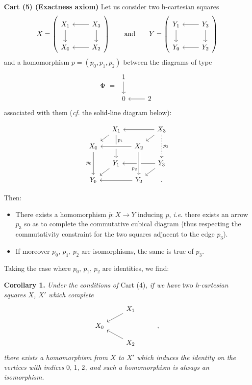 
\textbf{Cart (5) (Exactness axiom)} Let us consider two h-cartesian squares
\[
X = \left(\begin{tikzcd}
X_1 \ar[d] & X_3 \ar[l] \ar[d] \\
X_0 & X_2 \ar[l]
\end{tikzcd}\right)
\qquad \text{and} \qquad
Y = \left(\begin{tikzcd}
Y_1 \ar[d] & Y_3 \ar[l] \ar[d] \\
Y_0 & Y_2 \ar[l]
\end{tikzcd}\right)
\]
and a homomorphism $p = (p_0, p_1, p_2)$ between the diagrams of type
\[
\Phi \ = \
\begin{tikzcd}
1 \ar[d] & \\
0 & 2 \ar[l]
\end{tikzcd}
\]
associated with them (\textit{cf.} the solid-line diagram below):

\[
\begin{tikzcd}[row sep=small, column sep=small]
& X_1 \ar[dl] \ar[dd, "p_1" near start] & & X_3 \ar[ll] \ar[dl] \ar[dd, dotted, "p_3"] \\
X_0 \ar[dd, "p_0"'] & & X_2 \ar[ll, crossing over] & \\
& Y_1 \ar[dl] & & Y_3 \ar[ll] \ar[dl] \\
Y_0 & & Y_2 \ar[ll] \ar[from=uu, crossing over, "p_2"' near end] & .
\end{tikzcd}
\]

Then:
\begin{itemize}[leftmargin=2.5em]
\item[a)] There exists a homomorphism $\bar{p} : X \longrightarrow Y$ inducing $p$, \textit{i.e.} there exists an arrow $p_3$ so as to complete the commutative cubical diagram (thus respecting the commutativity constraint for the two squares adjacent to the edge $p_3$).
\item[b)] If moreover $p_0$, $p_1$, $p_2$ are isomorphisms, the same is true of $p_3$.
\end{itemize}

Taking the case where $p_0$, $p_1$, $p_2$ are identities, we find:

\textbf{Corollary 1.} \textit{Under the conditions of} Cart (4)\textit{, if we have} two \textit{h-cartesian squares $X$, $X'$ which complete}
\[
\begin{tikzcd}[row sep=small]
& X_1 \ar[dl] & \\
X_0 & & , \\
& X_2 \ar[ul] &
\end{tikzcd}
\]
\textit{there exists a homomorphism from $X$ to $X'$ which induces the identity on the vertices with indices} 0, 1, 2\textit{, and such a homomorphism is always an isomorphism.}


